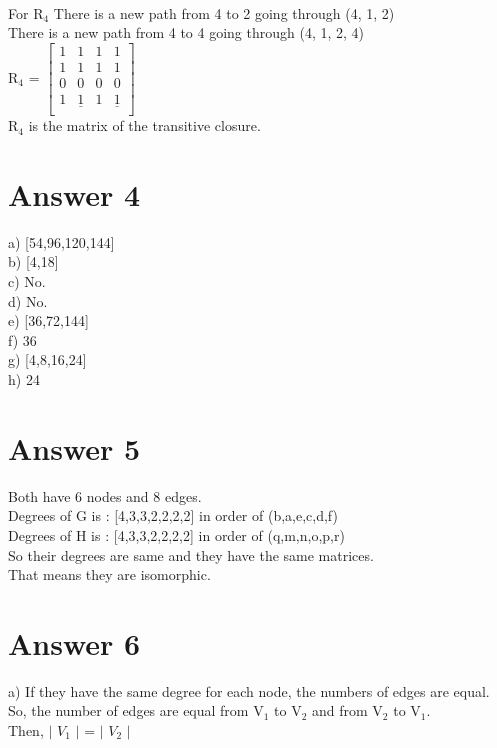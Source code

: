 \documentclass[12pt]{article}
\begin{document}
     \\
 For R$_4$ There is a new path from 4 to 2 going through (4, 1, 2) \\
 There is a new path from 4 to 4 going through (4, 1, 2, 4) \\
 R$_4$ = $\begin{bmatrix}
       1 & 1 & 1 & 1\\
       1 & 1 & 1 & 1\\
       0 & 0 & 0 & 0\\
       1 & \underline{1} & 1 & \underline{1}\\
     \end{bmatrix}$\\
 R$_4$ is the matrix of the transitive closure. \\
 
\section*{Answer 4}
 a) [54,96,120,144] \\
 b) [4,18] \\
 c) No. \\
 d) No. \\
 e) [36,72,144] \\
 f) 36 \\
 g) [4,8,16,24] \\
 h) 24 \\
 
\section*{Answer 5}
 Both have 6 nodes and 8 edges. \\
 Degrees of G is : [4,3,3,2,2,2,2] in order of (b,a,e,c,d,f)\\
 Degrees of H is : [4,3,3,2,2,2,2] in order of (q,m,n,o,p,r) \\
 So their degrees are same and they have the same matrices. \\
 That means they are isomorphic. \\
 
\section*{Answer 6}
 a) If they have the same degree for each node, the numbers of edges are equal. \\
 So, the number of edges are equal from V$_1$ to V$_2$ and from V$_2$ to V$_1$. \\
 Then, $\mid$ $V_1$ $\mid$ = $\mid$ $V_2$ $\mid$ \\
 
\end{document}
